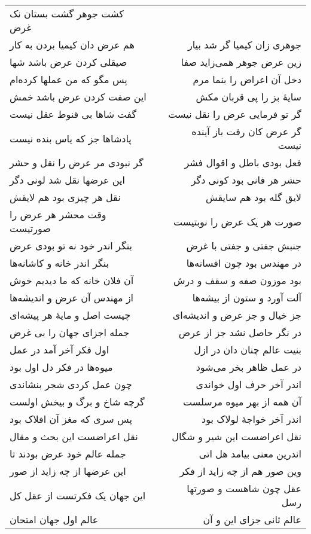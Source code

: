 \begin{center}
\begin{longtable}{l p{0.5cm} r}
کشت جوهر گشت بستان نک غرض
\\
هم عرض دان کیمیا بردن به کار
&&
جوهری زان کیمیا گر شد بیار
\\
صیقلی کردن عرض باشد شها
&&
زین عرض جوهر همی‌زاید صفا
\\
پس مگو که من عملها کرده‌ام
&&
دخل آن اعراض را بنما مرم
\\
این صفت کردن عرض باشد خمش
&&
سایهٔ بز را پی قربان مکش
\\
گفت شاها بی قنوط عقل نیست
&&
گر تو فرمایی عرض را نقل نیست
\\
پادشاها جز که یاس بنده نیست
&&
گر عرض کان رفت باز آینده نیست
\\
گر نبودی مر عرض را نقل و حشر
&&
فعل بودی باطل و اقوال فشر
\\
این عرضها نقل شد لونی دگر
&&
حشر هر فانی بود کونی دگر
\\
نقل هر چیزی بود هم لایقش
&&
لایق گله بود هم سایقش
\\
وقت محشر هر عرض را صورتیست
&&
صورت هر یک عرض را نوبتیست
\\
بنگر اندر خود نه تو بودی عرض
&&
جنبش جفتی و جفتی با غرض
\\
بنگر اندر خانه و کاشانه‌ها
&&
در مهندس بود چون افسانه‌ها
\\
آن فلان خانه که ما دیدیم خوش
&&
بود موزون صفه و سقف و درش
\\
از مهندس آن عرض و اندیشه‌ها
&&
آلت آورد و ستون از بیشه‌ها
\\
چیست اصل و مایهٔ هر پیشه‌ای
&&
جز خیال و جز عرض و اندیشه‌ای
\\
جمله اجزای جهان را بی غرض
&&
در نگر حاصل نشد جز از عرض
\\
اول فکر آخر آمد در عمل
&&
بنیت عالم چنان دان در ازل
\\
میوه‌ها در فکر دل اول بود
&&
در عمل ظاهر بخر می‌شود
\\
چون عمل کردی شجر بنشاندی
&&
اندر آخر حرف اول خواندی
\\
گرچه شاخ و برگ و بیخش اولست
&&
آن همه از بهر میوه مرسلست
\\
پس سری که مغز آن افلاک بود
&&
اندر آخر خواجهٔ لولاک بود
\\
نقل اعراضست این بحث و مقال
&&
نقل اعراضست این شیر و شگال
\\
جمله عالم خود عرض بودند تا
&&
اندرین معنی بیامد هل اتی
\\
این عرضها از چه زاید از صور
&&
وین صور هم از چه زاید از فکر
\\
این جهان یک فکرتست از عقل کل
&&
عقل چون شاهست و صورتها رسل
\\
عالم اول جهان امتحان
&&
عالم ثانی جزای این و آن
\\

\end{longtable}
\end{center}
